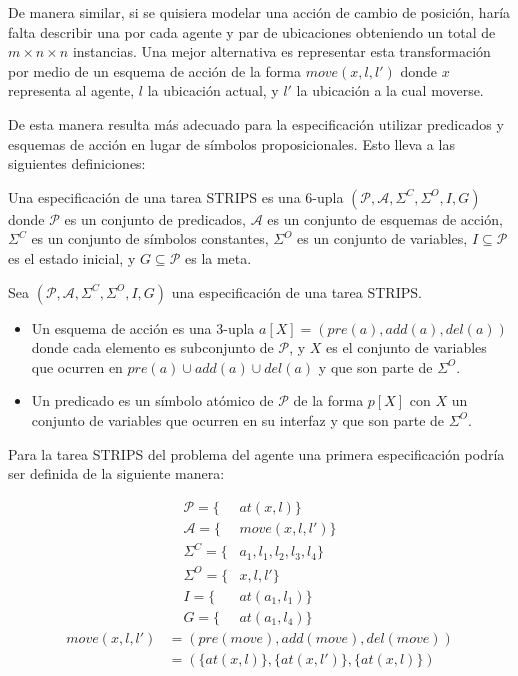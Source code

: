 De manera similar, si se quisiera modelar una acción de cambio de posición,
haría falta describir una por cada agente y par de ubicaciones obteniendo un
total de $m \times n \times n$ instancias. Una mejor alternativa es representar
esta transformación por medio de un esquema de acción de la forma $move(x, l,
l')$ donde $x$ representa al agente, $l$ la ubicación actual, y $l'$ la
ubicación a la cual moverse.

De esta manera resulta más adecuado para la especificación utilizar predicados y
esquemas de acción en lugar de símbolos proposicionales. Esto lleva a las
siguientes definiciones:

\begin{mydef}
    Una especificación de una tarea STRIPS es una 6-upla $(\mathcal{P},
    \mathcal{A}, \Sigma^{C}, \Sigma^{O}, I, G)$  donde $\mathcal{P}$ es un
    conjunto de predicados, $\mathcal{A}$ es un conjunto de esquemas de acción,
    $\Sigma^{C}$ es un conjunto de símbolos constantes, $\Sigma^{O}$ es un
    conjunto de variables, $I \subseteq \mathcal{P}$ es el estado inicial, y
    $G \subseteq \mathcal{P}$ es la meta.
\end{mydef}

\begin{mydef}
    Sea $(\mathcal{P}, \mathcal{A}, \Sigma^{C}, \Sigma^{O}, I, G)$ una
    especificación de una tarea STRIPS.

    \begin{itemize}
        \item Un esquema de acción es una 3-upla $a[X] = (pre(a), add(a),
        del(a))$ donde cada elemento es subconjunto de $\mathcal{P}$, y $X$ es
        el conjunto de variables que ocurren en $pre(a) \cup add(a) \cup del(a)$
        y que son parte de $\Sigma^{O}$.
        \item Un predicado es un símbolo atómico de $\mathcal{P}$ de la forma
        $p[X]$ con $X$ un conjunto de variables que ocurren en su interfaz y que
        son parte de $\Sigma^{O}$.
    \end{itemize}
\end{mydef}

Para la tarea STRIPS del problema del agente una primera especificación podría
ser definida de la siguiente manera:

\begin{align*}
    \mathcal{P} = \{&at(x, l)\} \\
    \mathcal{A} = \{&move(x, l, l')\} \\
    \Sigma^{C} = \{&a_1, l_1, l_2, l_3, l_4\} \\
    \Sigma^{O} = \{&x, l, l'\} \\
    I = \{&at(a_1, l_1)\} \\
    G = \{&at(a_1, l_4)\}
\end{align*}
\begin{align*}
    move(x, l, l') &= (pre(move), add(move), del(move)) \\
                   &= (\{at(x, l)\}, \{at(x, l')\},\{at(x, l)\})
\end{align*}

